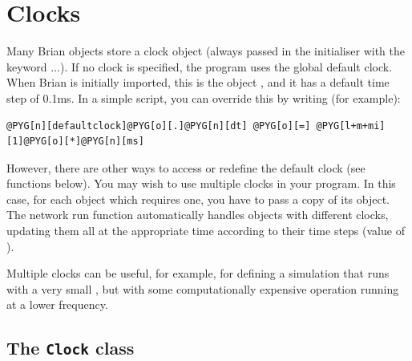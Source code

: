 \documentclass[letterpaper,10pt,english]{manual}
\begin{document}
\hypertarget{index-81}{}\section{Clocks}
Many Brian objects store a clock object (always passed in the
initialiser with the keyword ...). If no clock is specified,
the program uses the global default clock. When Brian is initially
imported, this is the object \hyperlink{brian.defaultclock}{}, and it has a default
time step of 0.1ms. In a simple script, you can override this by
writing (for example):

\begin{Verbatim}[commandchars=@\[\]]
@PYG[n][defaultclock]@PYG[o][.]@PYG[n][dt] @PYG[o][=] @PYG[l+m+mi][1]@PYG[o][*]@PYG[n][ms]
\end{Verbatim}

However, there are other ways to access or redefine the default
clock (see functions below).
You may wish to use multiple clocks in your program. In this case,
for each object which requires one, you have to pass a copy of its
\hyperlink{brian.Clock}{} object. The network run function automatically handles objects
with different clocks, updating them all at the appropriate time
according to their time steps (value of \hyperlink{brian.Clock.dt}{}).

Multiple clocks can be useful, for example, for defining a simulation
that runs with a very small , but with some computationally
expensive operation running at a lower frequency.


\subsection{The \texttt{Clock} class}
\end{document}
